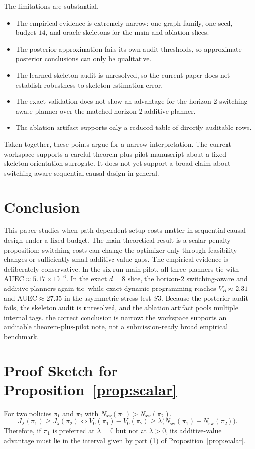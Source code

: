 \documentclass[10pt]{article}
\newcommand{\AUEC}{\mathrm{AUEC}}
\newcommand{\Jlambda}{J_\lambda}
\newcommand{\Nsw}{N_{\mathrm{sw}}}
\begin{document}
The limitations are substantial.
\begin{itemize}[leftmargin=1.1em]
  \item The empirical evidence is extremely narrow: one graph family, one seed, budget $14$, and oracle skeletons for the main and ablation slices.
  \item The posterior approximation fails its own audit thresholds, so approximate-posterior conclusions can only be qualitative.
  \item The learned-skeleton audit is unresolved, so the current paper does not establish robustness to skeleton-estimation error.
  \item The exact validation does not show an advantage for the horizon-2 switching-aware planner over the matched horizon-2 additive planner.
  \item The ablation artifact supports only a reduced table of directly auditable rows.
\end{itemize}

Taken together, these points argue for a narrow interpretation. The current workspace supports a careful theorem-plus-pilot manuscript about a fixed-skeleton orientation surrogate. It does not yet support a broad claim about switching-aware sequential causal design in general.

\section{Conclusion}
This paper studies when path-dependent setup costs matter in sequential causal design under a fixed budget. The main theoretical result is a scalar-penalty proposition: switching costs can change the optimizer only through feasibility changes or sufficiently small additive-value gaps. The empirical evidence is deliberately conservative. In the six-run main pilot, all three planners tie with \(\AUEC \approx 5.17\times 10^{-6}\). In the exact $d{=}8$ slice, the horizon-2 switching-aware and additive planners again tie, while exact dynamic programming reaches \(V_B \approx 2.31\) and \(\AUEC \approx 27.35\) in the asymmetric stress test $S3$. Because the posterior audit fails, the skeleton audit is unresolved, and the ablation artifact pools multiple internal tags, the correct conclusion is narrow: the workspace supports an auditable theorem-plus-pilot note, not a submission-ready broad empirical benchmark.

\appendix

\section{Proof Sketch for Proposition~\ref{prop:scalar}}
For two policies $\pi_1$ and $\pi_2$ with $\Nsw(\pi_1)>\Nsw(\pi_2)$,
\begin{equation}
\Jlambda(\pi_1)\ge \Jlambda(\pi_2)
\iff
V_0(\pi_1)-V_0(\pi_2)\ge
\lambda\bigl(\Nsw(\pi_1)-\Nsw(\pi_2)\bigr).
\end{equation}
Therefore, if $\pi_1$ is preferred at $\lambda=0$ but not at $\lambda>0$, its additive-value advantage must lie in the interval given by part (1) of Proposition~\ref{prop:scalar}.
\end{document}
